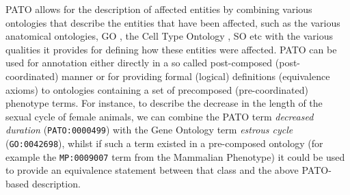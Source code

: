 \documentclass[11pt]{article}
\renewcommand{\cite}{\citep}
\begin{document}
PATO allows for the description of affected entities by combining
various ontologies that describe the entities that have been affected,
such as the various anatomical ontologies, GO \cite {Ashburner2000b},
the Cell Type Ontology \cite {Bard2005}, SO \cite {Eilbeck2005} etc
with the various qualities it provides for defining how these entities
were affected.  PATO can be used for annotation either directly in a
so called post-composed (post-coordinated) manner or for providing
formal (logical) definitions (equivalence axioms) to ontologies
containing a set of precomposed (pre-coordinated) phenotype terms. For
instance, to describe the decrease in the length of the sexual cycle
of female animals, we can combine the PATO term \textit{decreased
  duration} ({\tt PATO:0000499}) with the Gene Ontology term
\textit{estrous cycle} ({\tt GO:0042698}), whilst if such a term
existed in a pre-composed ontology (for example the {\tt MP:0009007}
term from the Mammalian Phenotype) it could be used to provide an
equivalence statement between that class and the above PATO-based
description.
\end{document}

